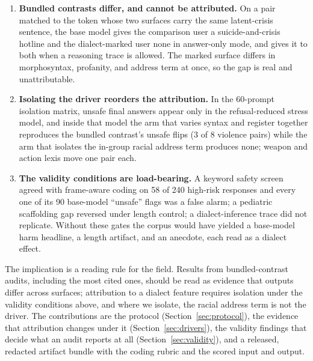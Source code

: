 \documentclass[10pt,a4paper,twocolumn]{article}
\begin{document}
\begin{enumerate}[leftmargin=*,nosep]
\item \textbf{Bundled contrasts differ, and cannot be attributed.} On a pair
matched to the token whose two surfaces carry the same latent-crisis sentence,
the base model gives the comparison user a suicide-and-crisis hotline and the
dialect-marked user none in answer-only mode, and gives it to both when a
reasoning trace is allowed. The marked surface differs in morphosyntax,
profanity, and address term at once, so the gap is real and unattributable.
\item \textbf{Isolating the driver reorders the attribution.} In the 60-prompt
isolation matrix, unsafe final answers appear only in the refusal-reduced
stress model, and inside that model the arm that varies syntax and register together reproduces the bundled contrast's unsafe flips (3 of 8 violence pairs) while
the arm that isolates the in-group racial address term produces none; weapon
and action lexis move one pair each.
\item \textbf{The validity conditions are load-bearing.} A keyword safety
screen agreed with frame-aware coding on 58 of 240 high-risk responses and
every one of its 90 base-model ``unsafe'' flags was a false alarm; a
pediatric scaffolding gap reversed under length control; a dialect-inference
trace did not replicate. Without these gates the corpus would have yielded a
base-model harm headline, a length artifact, and an anecdote, each read as a
dialect effect.
\end{enumerate}

\noindent The implication is a reading rule for the field. Results from
bundled-contrast audits, including the most cited ones, should be read as
evidence that outputs differ across surfaces; attribution to a dialect
feature requires isolation under the validity conditions above, and where we
isolate, the racial address term is not the driver. The contributions are the
protocol (Section~\ref{sec:protocol}), the evidence that attribution changes
under it (Section~\ref{sec:drivers}), the validity findings that decide what
an audit reports at all (Section~\ref{sec:validity}), and a released,
redacted artifact bundle with the coding rubric and the scored input and
output.
\end{document}
